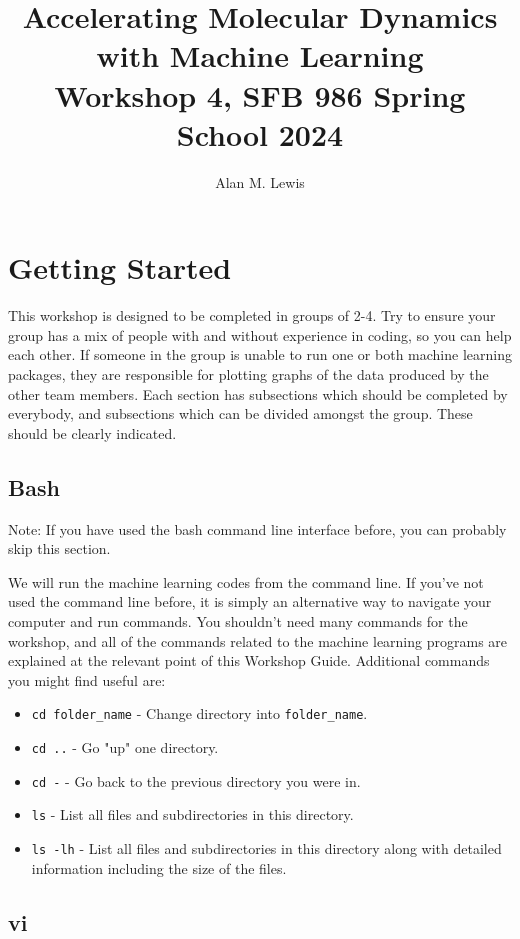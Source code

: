 \documentclass{article}
\title{\vspace{-5ex} Accelerating Molecular Dynamics with Machine Learning \\ Workshop 4, SFB 986 Spring School 2024}
\author{Alan M. Lewis}
\date{}
\begin{document}
\maketitle

\section{Getting Started}

This workshop is designed to be completed in groups of 2-4. Try to ensure your group has a mix of people with and without experience in coding, so you can help each other. If someone in the group is unable to run one or both machine learning packages, they are responsible for plotting graphs of the data produced by the other team members. Each section has subsections which should be completed by everybody, and subsections which can be divided amongst the group. These should be clearly indicated.

\subsection{Bash}
Note: If you have used the bash command line interface before, you can probably skip this section.

We will run the machine learning codes from the command line. If you've not used the command line before, it is simply an alternative way to navigate your computer and run commands. You shouldn't need many commands for the workshop, and all of the commands related to the machine learning programs are explained at the relevant point of this Workshop Guide. Additional commands you might find useful are:

\begin{itemize}

\item \verb|cd folder_name| - Change directory into \verb|folder_name|.
\item \verb|cd ..| - Go "up" one directory.
\item \verb|cd -| - Go back to the previous directory you were in.
\item \verb|ls| - List all files and subdirectories in this directory.
\item \verb|ls -lh| - List all files and subdirectories in this directory along with detailed information including the size of the files.

\end{itemize}

\subsection{vi}
\end{document}
